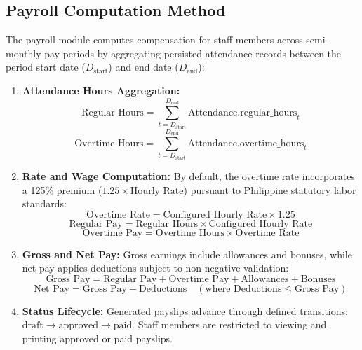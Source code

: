 \documentclass[12pt, letterpaper]{article}
\begin{document}
\subsection*{Payroll Computation Method}
\hspace*{2em} The payroll module computes compensation for staff members across semi-monthly pay periods by aggregating persisted attendance records between the period start date ($D_{\text{start}}$) and end date ($D_{\text{end}}$):
\begin{enumerate}[label=\alph*.]
    \item \textbf{Attendance Hours Aggregation:}
    \begin{equation}
    \text{Regular Hours} = \sum_{t=D_{\text{start}}}^{D_{\text{end}}} \text{Attendance.regular\_hours}_t
    \end{equation}
    \begin{equation}
    \text{Overtime Hours} = \sum_{t=D_{\text{start}}}^{D_{\text{end}}} \text{Attendance.overtime\_hours}_t
    \end{equation}
    \item \textbf{Rate and Wage Computation:} By default, the overtime rate incorporates a 125\% premium ($1.25 \times \text{Hourly Rate}$) pursuant to Philippine statutory labor standards:
    \begin{equation}
    \text{Overtime Rate} = \text{Configured Hourly Rate} \times 1.25
    \end{equation}
    \begin{equation}
    \text{Regular Pay} = \text{Regular Hours} \times \text{Configured Hourly Rate}
    \end{equation}
    \begin{equation}
    \text{Overtime Pay} = \text{Overtime Hours} \times \text{Overtime Rate}
    \end{equation}
    \item \textbf{Gross and Net Pay:} Gross earnings include allowances and bonuses, while net pay applies deductions subject to non-negative validation:
    \begin{equation}
    \text{Gross Pay} = \text{Regular Pay} + \text{Overtime Pay} + \text{Allowances} + \text{Bonuses}
    \end{equation}
    \begin{equation}
    \text{Net Pay} = \text{Gross Pay} - \text{Deductions} \quad (\text{where } \text{Deductions} \le \text{Gross Pay})
    \end{equation}
    \item \textbf{Status Lifecycle:} Generated payslips advance through defined transitions: $\text{draft} \rightarrow \text{approved} \rightarrow \text{paid}$. Staff members are restricted to viewing and printing approved or paid payslips.
\end{enumerate}
\end{document}
